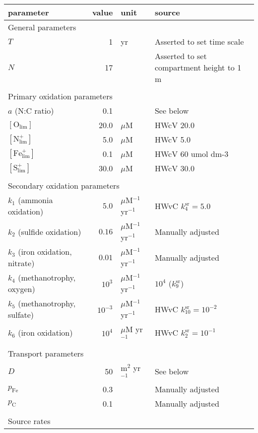 \documentclass{report}
\begin{document}
\begin{table}
\centering
\begin{tabular}{ l r l l }
\toprule
parameter & value & unit & source \\
\midrule
\multicolumn{4}{l}{General parameters} \\
$T$     & 1 & yr & Asserted to set time scale \\
$N$     & 17 & & Asserted to set compartment height to 1 m   \\
\\
\multicolumn{4}{l}{Primary oxidation parameters} \\
$a$ (N:C ratio)	&	0.1	& & See below \\
$\left[\mathrm{O}_\mathrm{lim}\right]$ & 20.0 & $\mu$M & HWcV 20.0 \\
$\left[\mathrm{N}^+_\mathrm{lim}\right]$ & 5.0 & $\mu$M & HWcV 5.0 \\
$\left[\mathrm{Fe}^+_\mathrm{lim}\right]$ & 0.1 & $\mu$M & HWcV 60 umol dm-3 \\
$\left[\mathrm{S}^+_\mathrm{lim}\right]$ & 30.0 & $\mu$M & HWcV 30.0 \\
\\
\multicolumn{4}{l}{Secondary oxidation parameters} \\
$k_1$ (ammonia oxidation)	& $5.0$	& $\mu$M$^{-1}$ yr$^{-1}$ & HWvC $k_{4}^\mathrm{sr} = 5.0$ \\
$k_2$ (sulfide oxidation)	& $0.16$	& $\mu$M$^{-1}$ yr$^{-1}$ & Manually adjusted \\
$k_3$ (iron oxidation, nitrate)	& $0.01$	& $\mu$M$^{-1}$ yr$^{-1}$ & Manually adjusted \\
$k_4$ (methanotrophy, oxygen)	& $10^{3}$	& $\mu$M$^{-1}$ yr$^{-1}$ & $10^{4}$ ($k_{9}^\mathrm{sr}$) \cite{hunterkinetic1998} \\
$k_5$ (methanotrophy, sulfate)	& $10^{-3}$	& $\mu$M$^{-1}$ yr$^{-1}$ & HWvC $k_{10}^\mathrm{sr} = 10^{-2}$ \\
$k_6$ (iron oxidation) & $10^4$ & $\mu$M yr$^{-1}$ & HWvC $k_{2}^\mathrm{sr} = 10^{-1}$ \\
\\
\multicolumn{4}{l}{Transport parameters} \\
$D$	&	50	&	m$^2$ yr$^{-1}$	&	See below \\
$p_\mathrm{Fe}$	&	0.3	&	& Manually adjusted \\
$p_\mathrm{C}$	&	0.1	&	& Manually adjusted \\
\\
\multicolumn{4}{l}{Source rates} \\

\end{tabular}
\end{table}
\end{document}
